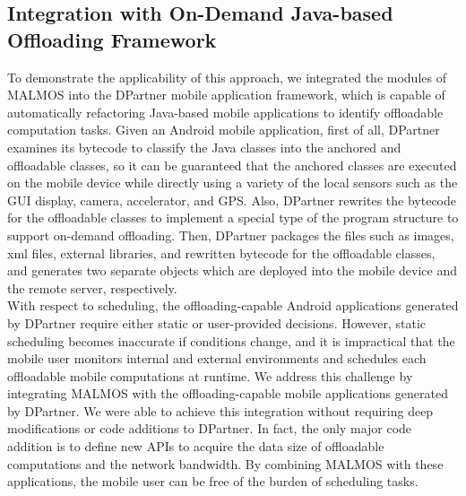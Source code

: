 \documentclass[10pt, conference, compsocconf]{IEEEtran}
\begin{document}
{{\subsection{Integration with On-Demand Java-based Offloading Framework}
%
To demonstrate the applicability of this approach, we integrated the
modules of MALMOS into the DPartner mobile application framework, which
is capable of automatically refactoring Java-based mobile applications
to identify offloadable computation tasks.
%
Given an Android mobile application, first of all, DPartner examines its
bytecode to classify the Java classes into the anchored and offloadable
classes, so it can be guaranteed that the anchored classes are executed
on the mobile device while directly using a variety of the local sensors
such as the GUI display, camera, accelerator, and GPS.
%
Also, DPartner rewrites the bytecode for the offloadable classes to
implement a special type of the program structure to support on-demand
offloading.
%
Then, DPartner packages the files such as images, xml files, external
libraries, and rewritten bytecode for the offloadable classes, and
generates two separate objects which are deployed into the mobile device
and the remote server, respectively.\\
%
\indent With respect to scheduling, the offloading-capable
Android applications generated by DPartner require either static or
user-provided decisions. 
%
However, static scheduling becomes inaccurate if conditions change, and
it is impractical that the mobile user monitors internal and
external environments and schedules each offloadable mobile computations
at runtime.
%
We address this challenge by integrating MALMOS with the
offloading-capable mobile applications generated by DPartner. 
%
We were able to achieve this integration without requiring deep
modifications or code additions to DPartner.
%
In fact, the only major code addition is to define new APIs to acquire
the data size of offloadable computations and the network bandwidth. 
%
By combining MALMOS with these applications, the mobile user can be free
of the burden of scheduling tasks.
%
}}
\end{document}
